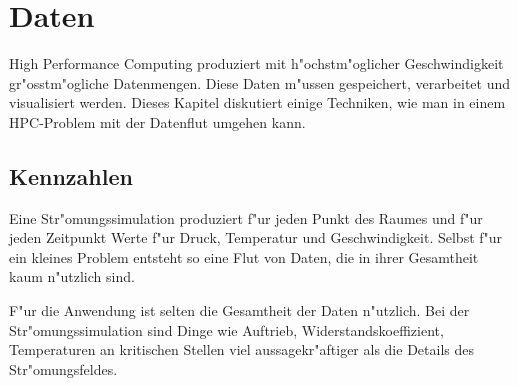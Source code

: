\chapter{Daten}
High Performance Computing produziert mit h"ochstm"oglicher Geschwindigkeit
gr"osstm"ogliche Datenmengen. Diese Daten m"ussen gespeichert, verarbeitet
und visualisiert werden.
Dieses Kapitel diskutiert einige Techniken, wie man in einem HPC-Problem
mit der Datenflut umgehen kann.

\section{Kennzahlen}
Eine Str"omungssimulation produziert f"ur jeden Punkt des Raumes und
f"ur jeden Zeitpunkt Werte f"ur Druck, Temperatur und Geschwindigkeit.
Selbst f"ur ein kleines Problem entsteht so eine Flut von Daten, die
in ihrer Gesamtheit kaum n"utzlich sind. 

F"ur die Anwendung ist selten die Gesamtheit der Daten n"utzlich.
Bei der Str"omungssimulation sind Dinge wie Auftrieb, Widerstandskoeffizient,
Temperaturen an kritischen Stellen viel aussagekr"aftiger als die Details
des Str"omungsfeldes. 

